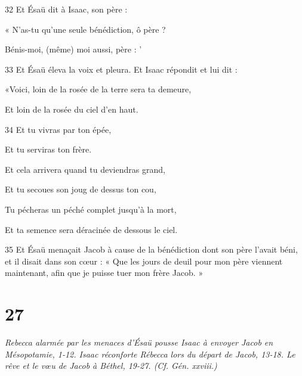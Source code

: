 \par    
\par 32 Et Ésaü dit à Isaac, son père :  
\par     « N'as-tu qu'une seule bénédiction, ô père ?  
\par     Bénis-moi, (même) moi aussi, père : '
\par    
\par 33 Et Ésaü éleva la voix et pleura. Et Isaac répondit et lui dit :
\par    
\par     «Voici, loin de la rosée de la terre sera ta demeure,  
\par     Et loin de la rosée du ciel d'en haut.
\par    
\par 34 Et tu vivras par ton épée,  
\par     Et tu serviras ton frère.
\par    
\par     Et cela arrivera quand tu deviendras grand,  
\par     Et tu secoues son joug de dessus ton cou,  
\par     Tu pécheras un péché complet jusqu'à la mort,  
\par     Et ta semence sera déracinée de dessous le ciel.
\par    
\par 35 Et Ésaü menaçait Jacob à cause de la bénédiction dont son père l'avait béni, et il disait dans son cœur : « Que les jours de deuil pour mon père viennent maintenant, afin que je puisse tuer mon frère Jacob. »

\chapter{27}

\par \textit{Rebecca alarmée par les menaces d'Ésaü pousse Isaac à envoyer Jacob en Mésopotamie, 1-12. Isaac réconforte Rébecca lors du départ de Jacob, 13-18. Le rêve et le vœu de Jacob à Béthel, 19-27. (Cf. Gén. xxviii.)}

